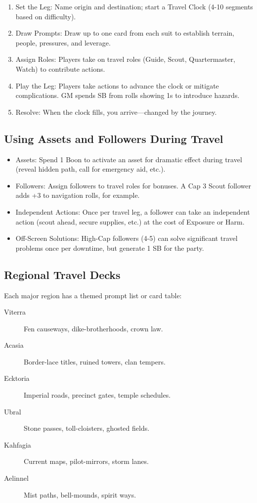 \documentclass[11pt,twoside,openany]{book}
\begin{document}
\begin{enumerate}
\item Set the Leg: Name origin and destination; start a Travel Clock (4-10 segments based on difficulty).
\item Draw Prompts: Draw up to one card from each suit to establish terrain, people, pressures, and leverage.
\item Assign Roles: Players take on travel roles (Guide, Scout, Quartermaster, Watch) to contribute actions.
\item Play the Leg: Players take actions to advance the clock or mitigate complications. GM spends SB from rolls showing 1s to introduce hazards.
\item Resolve: When the clock fills, you arrive—changed by the journey.
\end{enumerate}

\subsection*{Using Assets and Followers During Travel}

\begin{itemize}
\item Assets: Spend 1 Boon to activate an asset for dramatic effect during travel (reveal hidden path, call for emergency aid, etc.).
\item Followers: Assign followers to travel roles for bonuses. A Cap 3 Scout follower adds +3 to navigation rolls, for example.
\item Independent Actions: Once per travel leg, a follower can take an independent action (scout ahead, secure supplies, etc.) at the cost of Exposure or Harm.
\item Off-Screen Solutions: High-Cap followers (4-5) can solve significant travel problems once per downtime, but generate 1 SB for the party.
\end{itemize}

\subsection*{Regional Travel Decks}

Each major region has a themed prompt list or card table:
\begin{description}
\item[Viterra] Fen causeways, dike-brotherhoods, crown law.
\item[Acasia] Border-lace titles, ruined towers, clan tempers.
\item[Ecktoria] Imperial roads, precinct gates, temple schedules.
\item[Ubral] Stone passes, toll-cloisters, ghosted fields.
\item[Kahfagia] Current maps, pilot-mirrors, storm lanes.
\item[Aelinnel] Mist paths, bell-mounds, spirit ways.
\end{description}
\end{document}
